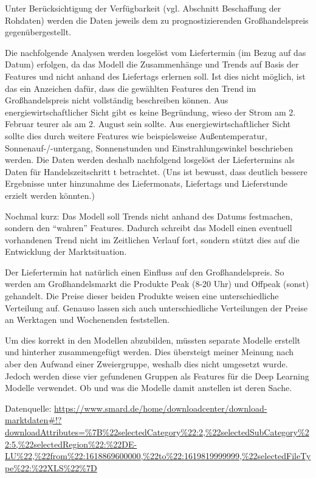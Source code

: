Unter Berücksichtigung der Verfügbarkeit (vgl. Abschnitt Beschaffung der Rohdaten) werden die Daten jeweils dem zu prognostizierenden Großhandelspreis gegenübergestellt. 

Die nachfolgende Analysen werden losgelöst vom Liefertermin (im Bezug auf das Datum) erfolgen, da das Modell die Zusammenhänge und Trends auf Basis der Features und nicht anhand des Liefertags erlernen soll. Ist dies nicht möglich, ist das ein Anzeichen dafür, dass die gewählten Features den Trend im Großhandelspreis nicht vollständig beschreiben können. Aus energiewirtschaftlicher Sicht gibt es keine Begründung, wieso der Strom am 2. Februar teurer als am 2. August sein sollte. Aus energiewirtschaftlicher Sicht sollte dies durch weitere Features wie beispielsweise Außentemperatur, Sonnenauf-/-untergang, Sonnenstunden und Einstrahlungswinkel beschrieben werden. Die Daten werden deshalb nachfolgend losgelöst der Liefertermins als Daten für Handelszeitschritt t betrachtet. (Uns ist bewusst, dass deutlich bessere Ergebnisse unter hinzunahme des Liefermonats, Liefertags und Lieferstunde erzielt werden könnten.)

Nochmal kurz: Das Modell soll Trends nicht anhand des Datums festmachen, sondern den ``wahren'' Features. Dadurch schreibt das Modell einen eventuell vorhandenen Trend nicht im Zeitlichen Verlauf fort, sondern stützt dies auf die Entwicklung der Marktsituation. 


Der Liefertermin hat natürlich einen Einfluss auf den Großhandelspreis. So werden am Großhandelsmarkt die Produkte Peak (8-20 Uhr) und Offpeak (sonst) gehandelt. Die Preise dieser beiden Produkte weisen eine unterschiedliche Verteilung auf. 
Genauso lassen sich auch unterschiedliche Verteilungen der Preise an Werktagen und Wochenenden feststellen. 

Um dies korrekt in den Modellen abzubilden, müssten separate Modelle erstellt und hinterher zusammengefügt werden. Dies übersteigt meiner Meinung nach aber den Aufwand einer Zweiergruppe, weshalb dies nicht umgesetzt wurde. Jedoch werden diese vier gefundenen Gruppen als Features für die Deep Learning Modelle verwendet. Ob und was die Modelle damit anstellen ist deren Sache.




Datenquelle: \url{https://www.smard.de/home/downloadcenter/download-marktdaten#!?downloadAttributes=%7B%22selectedCategory%22:2,%22selectedSubCategory%22:5,%22selectedRegion%22:%22DE-LU%22,%22from%22:1618869600000,%22to%22:1619819999999,%22selectedFileType%22:%22XLS%22%7D}